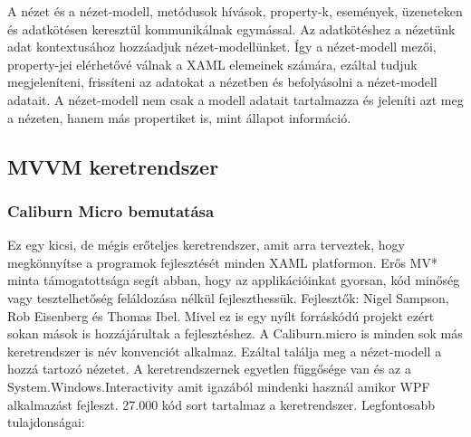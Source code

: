 \documentclass[
]{thesis-ekf}
\theoremstyle{definition}
\theoremstyle{remark}
\begin{document}
A nézet és a nézet-modell, metódusok hívások, property-k, események, üzeneteken és adatkötésen keresztül kommunikálnak egymással. Az adatkötéshez a nézetünk adat kontextusához hozzáadjuk nézet-modellünket. Így a nézet-modell mezői, property-jei elérhetővé válnak a XAML elemeinek számára, ezáltal tudjuk megjeleníteni, frissíteni az adatokat a nézetben és befolyásolni a nézet-modell adatait. A nézet-modell nem csak a modell adatait tartalmazza és jeleníti azt meg a nézeten, hanem más propertiket is, mint állapot információ.


\subsection{MVVM keretrendszer}
\subsubsection{Caliburn Micro bemutatása}
Ez egy kicsi, de mégis erőteljes keretrendszer, amit arra terveztek, hogy megkönnyítse a programok fejlesztését minden XAML platformon. Erős MV* minta támogatottsága segít abban, hogy az applikációinkat gyorsan, kód minőség vagy tesztelhetőség feláldozása nélkül fejleszthessük. Fejlesztők: Nigel Sampson, Rob Eisenberg és Thomas Ibel. Mivel ez is egy nyílt forráskódú projekt ezért sokan mások is hozzájárultak a fejlesztéshez. A Caliburn.micro is minden sok más keretrendszer is név konvenciót alkalmaz. Ezáltal találja meg a nézet-modell a hozzá tartozó nézetet. A keretrendszernek egyetlen függősége van és az a System.Windows.Interactivity amit igazából mindenki használ amikor WPF alkalmazást fejleszt. 27.000 kód sort tartalmaz a keretrendszer.\cite{caliburn} Legfontosabb tulajdonságai: 
\end{document}
